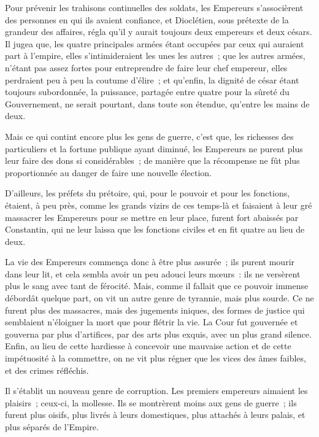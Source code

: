\documentclass[french,twoside]{book} %
\newcommand\chaptercont{} %
\begin{document}
\chaptercont
\noindent Pour prévenir les trahisons continuelles des soldats, les Empereurs s’associèrent des personnes en qui ils avaient confiance, et Dioclétien, sous prétexte de la grandeur des affaires, régla qu’il y aurait toujours deux empereurs et deux césars. Il jugea que, les quatre principales armées étant occupées par ceux qui auraient part à l’empire, elles s’intimideraient les unes les autres ; que les autres armées, n’étant pas assez fortes pour entreprendre de faire leur chef empereur, elles perdraient peu à peu la coutume d’élire ; et qu’enfin, la dignité de césar étant toujours subordonnée, la puissance, partagée entre quatre pour la sûreté du Gouvernement, ne serait pourtant, dans toute son étendue, qu’entre les mains de deux.\par
Mais ce qui contint encore plus les gens de guerre, c’est que, les richesses des particuliers et la fortune publique ayant diminué, les Empereurs ne purent plus leur faire des dons si considérables ; de manière que la récompense ne fût plus proportionnée au danger de faire une nouvelle élection.\par
D’ailleurs, les préfets du prétoire, qui, pour le pouvoir et pour les fonctions, étaient, à peu près, comme les grands vizirs de ces temps-là et faisaient à leur gré massacrer les Empereurs pour se mettre en leur place, furent fort abaissés par Constantin, qui ne leur laissa que les fonctions civiles et en fit quatre au lieu de deux.\par
La vie des Empereurs commença donc à être plus assurée ; ils purent mourir dans leur lit, et cela sembla avoir un peu adouci leurs mœurs : ils ne versèrent plus le sang avec tant de férocité. Mais, comme il fallait que ce pouvoir immense débordât quelque part, on vit un autre genre de tyrannie, mais plus sourde. Ce ne furent plus des massacres, mais des jugements iniques, des formes de justice qui semblaient n’éloigner la mort que pour flétrir la vie. La Cour fut gouvernée et gouverna par plus d’artifices, par des arts plus exquis, avec un plus grand silence. Enfin, au lieu de cette hardiesse à concevoir une mauvaise action et de cette impétuosité à la commettre, on ne vit plus régner que les vices des âmes faibles, et des crimes réfléchis.\par
Il s’établit un nouveau genre de corruption. Les premiers empereurs aimaient les plaisirs ; ceux-ci, la mollesse. Ils se montrèrent moins aux gens de guerre ; ils furent plus oisifs, plus livrés à leurs domestiques, plus attachés à leurs palais, et plus séparés de l’Empire.\par
\end{document}
